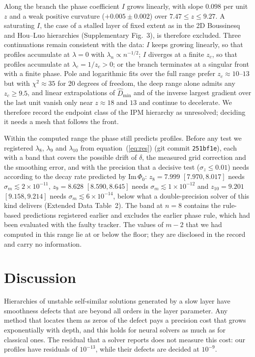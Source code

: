 \documentclass[11pt]{article}
\newcommand{\Dh}{\hat D}
\newcommand{\ImP}{\mathrm{Im}\,\Phi_0}
\begin{document}
Along the branch the phase coefficient $I$ grows linearly, with slope $0.098$ per unit $z$ and a weak positive
curvature ($+0.005\pm0.002$) over $7.47\le z\le9.27$. A saturating $I$, the case of a stalled layer of fixed extent as
in the 2D Boussinesq and Hou--Luo hierarchies (Supplementary Fig.~3), is therefore excluded. Three continuations remain consistent with the
data: $I$ keeps growing linearly, so that profiles accumulate at $\lambda=0$ with $\lambda_n\propto n^{-1/2}$; $I$
diverges at a finite $z_c$, so that profiles accumulate at $\lambda_c=1/z_c>0$; or the branch terminates at a singular
front with a finite phase. Pole and logarithmic fits over the full range prefer $z_c\approx10$--$13$ but with
$\chi^2\approx35$ for 20 degrees of freedom, the deep range alone admits any $z_c\ge9.5$, and linear extrapolations of
$\Dh_{\min}$ and of the inverse largest gradient over the last unit vanish only near $z\approx18$ and $13$ and
continue to decelerate. We therefore record the endpoint class of the IPM hierarchy as unresolved; deciding it needs a
mesh that follows the front.

Within the computed range the phase still predicts profiles. Before any test we registered $\lambda_8$, $\lambda_9$ and
$\lambda_{10}$ from equation~(\ref{eq:res}) (git commit \texttt{251bf1e}), each with a band that covers the possible
drift of $\delta$, the measured grid correction and the smoothing error, and with the precision that a decisive test
($\sigma_z\le0.01$) needs according to the decay rate predicted by $\ImP$: $z_8=7.999$ $[7.970,8.017]$ needs
$\sigma_m\lesssim2\times10^{-11}$, $z_9=8.628$ $[8.590,8.645]$ needs $\sigma_m\lesssim1\times10^{-12}$ and
$z_{10}=9.201$ $[9.158,9.214]$ needs $\sigma_m\lesssim6\times10^{-14}$, below what a double-precision solver of this
kind delivers (Extended Data Table~2). The band at $n=8$ contains the rule-based predictions registered earlier and excludes the
earlier phase rule, which had been evaluated with the faulty tracker. The values of $m-2$ that we had computed in this
range lie at or below the floor; they are disclosed in the record and carry no information.

\section*{Discussion}

Hierarchies of unstable self-similar solutions generated by a slow layer have smoothness defects that are beyond all
orders in the layer parameter. Any method that locates them as zeros of the defect pays a precision cost that grows
exponentially with depth, and this holds for neural solvers as much as for classical ones. The residual that a solver
reports does not measure this cost: our profiles have residuals of $10^{-13}$, while their defects are decided at
$10^{-9}$.
\end{document}
